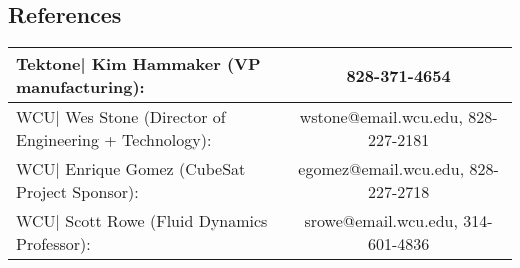 \documentclass[allblack]{simplehipstercv}
\begin{document}
\begin{paracol}{2}
\section*{References}
\begin{tabular}{l c}
    Tektone| Kim Hammaker (VP manufacturing): & 828-371-4654\\
    \hline
    WCU| Wes Stone (Director of Engineering + Technology): & wstone@email.wcu.edu, 828-227-2181\\
    \hline
    WCU| Enrique Gomez (CubeSat Project Sponsor): & egomez@email.wcu.edu, 828-227-2718\\
    \hline
    WCU| Scott Rowe (Fluid Dynamics Professor): & srowe@email.wcu.edu, 314-601-4836
\end{tabular}
\bigskip
\newpage

\end{paracol}
\end{document}
